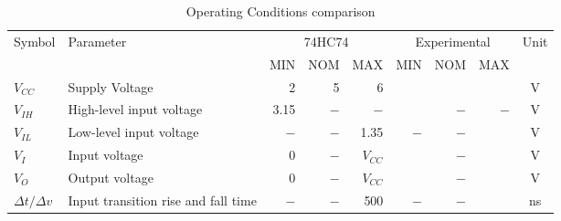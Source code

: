 \usepackage{multirow}
\usepackage{booktabs}
    
    
    
    \begin{table}[h!]
        \begin{center}
            \begin{tabular}{|l|l|r|r|r|r|r|r|c|}
                \toprule
                Symbol  &Parameter  &\multicolumn{3}{|c|}{74HC74}&\multicolumn{3}{|c|}{Experimental}&Unit\\
                        &           &   MIN&NOM&MAX&MIN&NOM&MAX&\\
                \midrule
                $V_{CC}$&Supply Voltage&2&5&6&  &  &  &V\\
                $V_{IH}$&High-level input voltage&3.15&$-$&$-$&   &$-$&$-$&V\\
                $V_{IL}$&Low-level input voltage&$-$&$-$&1.35&$-$&$-$&  &V\\
                $V_{I}$ &Input voltage&0&$-$&$V_{CC}$&  &$-$&   &V\\
                $V_{O}$ &Output voltage&0&$-$&$V_{CC}$&  &$-$&   &V\\
                $\Delta t / \Delta v$&  Input transition \newline rise and fall time&$-$&$-$&500&$-$&$-$&   &ns\\
                \bottomrule
            \end{tabular}
            \caption{Operating Conditions comparison}
            \label{tab:e6t1}
        \end{center}
    \end{table}